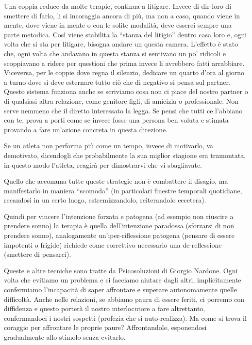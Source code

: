 \documentclass[12pt]{book} %
\begin{document}
\begin{mdframed}[linewidth=1pt]
Una coppia reduce da molte terapie, continua a litigare. Invece di dir loro di smettere di farlo, li si incoraggia
ancora di più, ma non a caso, quando viene in mente, dove viene in mente o con le solite modalità, deve esserci sempre
una parte metodica. Così viene stabilita la “stanza del litigio” dentro casa loro e, ogni volta che si sta per
litigare, bisogna andare un questa camera. L'effetto è stato che, ogni volta che andavano in questa stanza si sentivano
un po' ridicoli e scoppiavano a ridere per questioni che prima invece li avrebbero fatti arrabbiare. Viceversa, per le
coppie dove regna il silenzio, dedicare un quarto d'ora al giorno a turno dove si deve esternare
tutto ciò che di negativo si pensa sul partner. Questo sistema funziona anche se scriviamo cosa non ci piace del nostro
partner o di qualsiasi altra relazione, come genitore figli, di amicizia o professionale. Non serve nemmeno che il
diretto interessato la legga. Se pensi che tutti ce l'abbiano con te, prova a porti come se invece fosse una persona
ben voluta e stimata provando a fare un'azione concreta in questa direzione. 

Se un atleta non performa più come un tempo, invece di motivarlo, va demotivato, dicendogli che probabilmente la sua
miglior stagione era tramontata, in questo modo l'atleta, reagirà per dimostrarvi che vi sbagliavate. 

Quello che accomuna tutte queste strategie non è combattere il disagio, ma manifestarlo in maniera “scomoda” (in
particolari finestre temporali quotidiane, recandosi in un certo luogo, estremizzandolo, reiterandolo eccetera).

Quindi per vincere l'intenzione forzata e patogena (ad esempio non riuscire a prendere sonno) la
terapia è quella dell'intenzione paradossa (sforzarsi di non prendere sonno), analogamente
un'iper-riflessione patogena (pensare di essere impotenti o frigide) richiede come correttivo
necessario una de-reflessione (smettere di pensarci).

Queste e altre tecniche sono tratte da Psicosoluzioni di Giorgio Nardone. 
Ogni volta che evitiamo un problema e ci facciamo aiutare dagli altri, implicitamente confermiamo l'incapacità di saper affrontare e superare autonomamente quelle difficoltà. Anche nelle relazioni, se abbiamo paura di essere feriti, ci porremo con diffidenza e questo porterà il
nostro interlocutore a fare altrettanto, confermandoci i nostri sospetti (profezia che si auto-realizza). Ma come si
trova il coraggio per affrontare le proprie paure? Affrontandole, esponendosi gradualmente allo stimolo senza evitarlo.
\end{mdframed}
\end{document}
